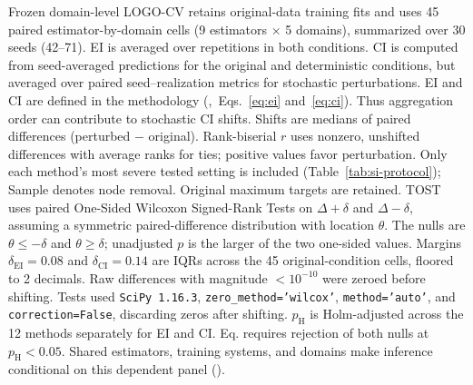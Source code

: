 \documentclass{article}
\begin{document}
\begin{table}[H]
\begin{minipage}{\linewidth}
Frozen domain-level LOGO-CV retains original-data training fits and uses 45 paired estimator-by-domain cells (9 estimators $\times$ 5 domains), summarized over 30 seeds (42--71). EI is averaged over repetitions in both conditions. CI is computed from seed-averaged predictions for the original and deterministic conditions, but averaged over paired seed--realization metrics for stochastic perturbations. EI and CI are defined in the methodology (,~Eqs.~\eqref{eq:ei} and~\eqref{eq:ci}). Thus aggregation order can contribute to stochastic CI shifts. Shifts are medians of paired differences (perturbed $-$ original). Rank-biserial $r$ uses nonzero, unshifted differences with average ranks for ties; positive values favor perturbation. Only each method's most severe tested setting is included (Table~\ref{tab:si-protocol}); Sample denotes node removal. Original maximum targets are retained. TOST uses paired One-Sided Wilcoxon Signed-Rank Tests on $\Delta+\delta$ and $\Delta-\delta$, assuming a symmetric paired-difference distribution with location $\theta$. The nulls are $\theta\leq-\delta$ and $\theta\geq\delta$; unadjusted $p$ is the larger of the two one-sided values. Margins $\delta_{\mathrm{EI}} = 0.08$ and $\delta_{\mathrm{CI}} = 0.14$ are IQRs across the 45 original-condition cells, floored to 2 decimals. Raw differences with magnitude $<10^{-10}$ were zeroed before shifting. Tests used \texttt{SciPy 1.16.3}, \texttt{zero\_method='wilcox'}, \texttt{method='auto'}, and \texttt{correction=False}, discarding zeros after shifting. $p_{\mathrm H}$ is Holm-adjusted across the 12 methods separately for EI and CI. Eq. requires rejection of both nulls at $p_{\mathrm H}<0.05$. Shared estimators, training systems, and domains make inference conditional on this dependent panel ().
\end{minipage}
\end{table}
\end{document}
